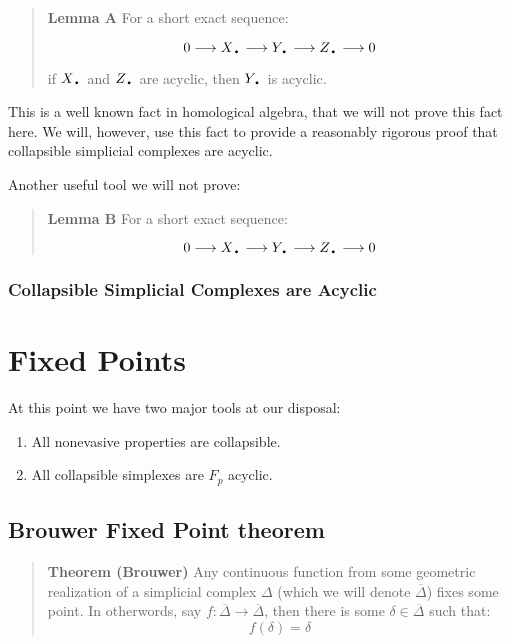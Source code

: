 \documentclass[letterpaper,12pt]{article}
\newcommand{\lra}{\longrightarrow}
\newcommand{\tb}{\text{\textbullet}}
\newcommand{\ol}{\overline}
\begin{document}
\begin{quote}
    \textbf{Lemma A} For a short exact sequence:

    $$0 \lra X_{\tb} \lra Y_{\tb} \lra Z_{\tb} \lra 0 $$

    if $X_{\tb}$ and $Z_{\tb}$ are acyclic, then $Y_{\tb}$ is acyclic.
\end{quote}

This is a well known fact in homological algebra, that we will not prove this fact here. We will, however, use this fact to provide a reasonably rigorous proof that collapsible simplicial complexes are acyclic.


Another useful tool we will not prove:

\begin{quote}
    \textbf{Lemma B} For a short exact sequence:

    $$0 \lra X_{\tb} \lra Y_{\tb} \lra Z_{\tb} \lra 0 $$ 

\end{quote}

\subsubsection{Collapsible Simplicial Complexes are Acyclic}

\section{Fixed Points}

At this point we have two major tools at our disposal:

\begin{enumerate}
    \item{
            All nonevasive properties are collapsible.
        }
    \item{
            All collapsible simplexes are $F_p$ acyclic.
        }
\end{enumerate}


\subsection{Brouwer Fixed Point theorem}

\begin{quote}
    \textbf{Theorem (Brouwer)} Any continuous function from some geometric realization of a simplicial complex $\Delta$ (which we will denote $\ol{\Delta}$) fixes some point. In otherwords, say $f : \ol{\Delta} \to \ol{\Delta}$, then there is some $\delta \in \ol{\Delta}$ such that:
    $$f(\delta) = \delta$$
\end{quote}
\end{document}
